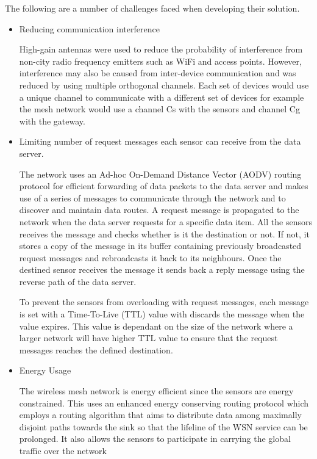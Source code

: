 The following are a number of challenges \citeauthor{fotuewsnpollution} faced when developing their solution.

\begin{itemize}
\item Reducing communication interference

High-gain antennas were used to reduce the probability of interference from non-city radio frequency emitters such as WiFi and access points. However, interference may also be caused from inter-device communication and was reduced by using multiple orthogonal channels. Each set of devices would use a unique channel to communicate with a different set of devices for example the mesh network would use a channel Cs with the sensors and channel Cg with the gateway.

\item Limiting number of request messages each sensor can receive from the data server.

The network uses an Ad-hoc On-Demand Distance Vector (AODV) routing protocol for efficient forwarding of data packets to the data server and makes use of a series of messages to communicate through the network and to discover and maintain data routes. A request message is propagated to the network when the data server requests for a specific data item. All the sensors receives the message and checks whether is it the destination or not. If not, it stores a copy of the message in its buffer containing previously broadcasted request messages and rebroadcasts it back to its neighbours. Once the destined sensor receives the message it sends back a reply message using the reverse path of the data server.

To prevent the sensors from overloading with request messages, each message is set with a Time-To-Live (TTL) value with discards the message when the value expires. This value is dependant on the size of the network where a larger network will have higher TTL value to ensure that the request messages reaches the defined destination.

\item Energy Usage

The wireless mesh network is energy efficient since the sensors are energy constrained. This uses an enhanced energy conserving routing protocol which employs a routing algorithm that aims to distribute data among maximally disjoint paths towards the sink so that the lifeline of the WSN service can be prolonged. It also allows the sensors to participate in carrying the global traffic over the network


\end{itemize}
